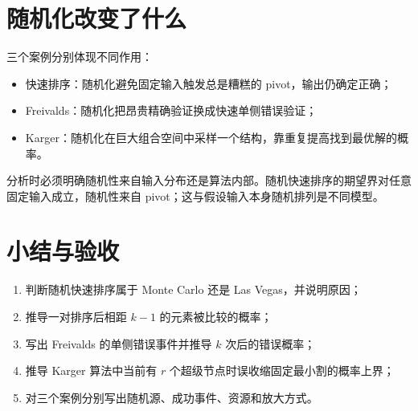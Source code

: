 \section{随机化改变了什么}

三个案例分别体现不同作用：
\begin{itemize}
  \item 快速排序：随机化避免固定输入触发总是糟糕的 pivot，输出仍确定正确；
  \item Freivalds：随机化把昂贵精确验证换成快速单侧错误验证；
  \item Karger：随机化在巨大组合空间中采样一个结构，靠重复提高找到最优解的概率。
\end{itemize}

分析时必须明确随机性来自输入分布还是算法内部。随机快速排序的期望界对任意固定输入成立，随机性来自 pivot；这与假设输入本身随机排列是不同模型。

\section{小结与验收}

\begin{checkpointbox}
\begin{enumerate}
  \item 判断随机快速排序属于 Monte Carlo 还是 Las Vegas，并说明原因；
  \item 推导一对排序后相距 $k-1$ 的元素被比较的概率；
  \item 写出 Freivalds 的单侧错误事件并推导 $k$ 次后的错误概率；
  \item 推导 Karger 算法中当前有 $r$ 个超级节点时误收缩固定最小割的概率上界；
  \item 对三个案例分别写出随机源、成功事件、资源和放大方式。
\end{enumerate}
\end{checkpointbox}
